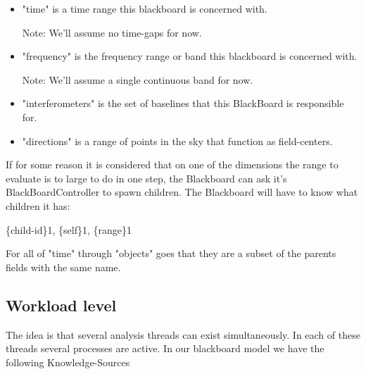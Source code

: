 \documentclass[]{lofar}
\begin{document}
      \begin{itemize}

	\item 

          "time" is a time range this blackboard is concerned with.
          \begin{em}\large{Note: }
            We'll assume no time-gaps for now.
          \end{em}

	\item 

          "frequency" is the frequency range or band this blackboard
          is concerned with.
          \begin{em}\large{Note: }
            We'll assume a single continuous band for now.
          \end{em}

	\item 

          "interferometers" is the set of baselines that this
          BlackBoard is responsible for.

	\item 

          "directions" is a range of points in the sky that function
          as field-centers.

      \end{itemize}

      If for some reason it is considered that on one of the
      dimensions the range to evaluate is to large to do in one step,
      the Blackboard can ask it's BlackBoardController to spawn
      children. The Blackboard will have to know what children it has:

      \{child-id\}1, \{self\}1, \{range\}1

      For all of "time" through "objects" goes that they are a subset
      of the parents fields with the same name.

    \subsection{Workload level}
    \label{id2721606}\hypertarget{id2721606}{}%

      The idea is that several analysis threads can exist
      simultaneously. In each of these threads several processes are
      active. In our blackboard model we have the following
      Knowledge-Sources
\end{document}
